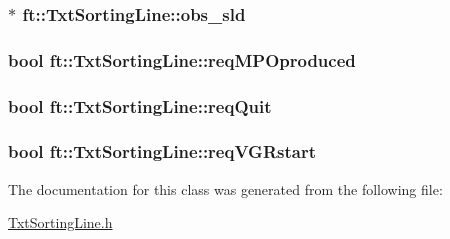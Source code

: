 \subsubsection[{\texorpdfstring{obs\+\_\+sld}{obs_sld}}]{$\ast$ ft\+::\+Txt\+Sorting\+Line\+::obs\+\_\+sld\hspace{0.3cm}{\ttfamily [protected]}}\hypertarget{classft_1_1_txt_sorting_line_a7378daf49a78d447da341f7fed2e020e}{}\label{classft_1_1_txt_sorting_line_a7378daf49a78d447da341f7fed2e020e}
\subsubsection[{\texorpdfstring{req\+M\+P\+Oproduced}{reqMPOproduced}}]{\setlength{\rightskip}{0pt plus 5cm}bool ft\+::\+Txt\+Sorting\+Line\+::req\+M\+P\+Oproduced\hspace{0.3cm}{\ttfamily [protected]}}\hypertarget{classft_1_1_txt_sorting_line_a38dfabdf03d7e435e8a4517b3fa8bbd9}{}\label{classft_1_1_txt_sorting_line_a38dfabdf03d7e435e8a4517b3fa8bbd9}
\subsubsection[{\texorpdfstring{req\+Quit}{reqQuit}}]{\setlength{\rightskip}{0pt plus 5cm}bool ft\+::\+Txt\+Sorting\+Line\+::req\+Quit\hspace{0.3cm}{\ttfamily [protected]}}\hypertarget{classft_1_1_txt_sorting_line_a456c088610779e8b77925a40171e4687}{}\label{classft_1_1_txt_sorting_line_a456c088610779e8b77925a40171e4687}
\subsubsection[{\texorpdfstring{req\+V\+G\+Rstart}{reqVGRstart}}]{\setlength{\rightskip}{0pt plus 5cm}bool ft\+::\+Txt\+Sorting\+Line\+::req\+V\+G\+Rstart\hspace{0.3cm}{\ttfamily [protected]}}\hypertarget{classft_1_1_txt_sorting_line_a6e9c2cb70b22ddee0e38233aa78cd96a}{}\label{classft_1_1_txt_sorting_line_a6e9c2cb70b22ddee0e38233aa78cd96a}


The documentation for this class was generated from the following file\+:\begin{DoxyCompactItemize}
\item 
\hyperlink{_txt_sorting_line_8h}{Txt\+Sorting\+Line.\+h}\end{DoxyCompactItemize}
